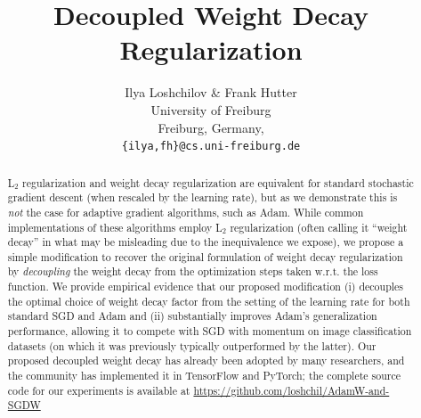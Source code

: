 \documentclass[usenames,dvipsnames]{article} %
\title{Decoupled Weight Decay Regularization}
\author{Ilya Loshchilov \& Frank Hutter \\
University of Freiburg\\
Freiburg, Germany, \\
\texttt{\{ilya,fh\}@cs.uni-freiburg.de} 
}
\begin{document}
\maketitle








\begin{abstract} 
L$_2$ regularization and weight decay regularization are equivalent for standard stochastic gradient descent (when rescaled by the learning rate), but as we demonstrate this is \emph{not} the case for adaptive gradient algorithms, such as Adam.
%
While common implementations of these algorithms employ L$_2$ regularization (often calling it ``weight decay'' in what may be misleading due to the inequivalence we expose), we propose a simple modification to recover the original formulation of weight decay regularization by \emph{decoupling} the weight decay from the optimization steps taken w.r.t. the loss function.
%
We provide empirical evidence that our proposed modification (i) decouples the optimal choice of weight decay factor from the setting of the learning rate for both standard SGD and Adam and (ii) substantially improves Adam's generalization performance, allowing it to compete with SGD with momentum on image classification datasets (on which it was previously typically outperformed by the latter).
%
Our proposed decoupled weight decay has already been adopted by many researchers, and the community has implemented it in TensorFlow and PyTorch; the complete source code for our experiments is available at \url{https://github.com/loshchil/AdamW-and-SGDW}


\end{abstract}
\end{document}
